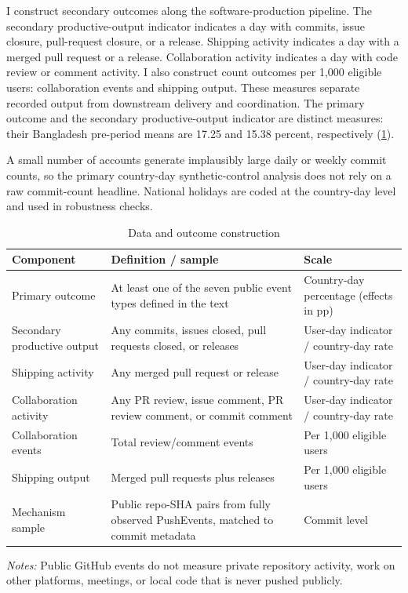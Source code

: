I construct secondary outcomes along the software-production pipeline. The secondary productive-output indicator indicates a day with commits, issue closure, pull-request closure, or a release. Shipping activity indicates a day with a merged pull request or a release. Collaboration activity indicates a day with code review or comment activity. I also construct count outcomes per 1,000 eligible users: collaboration events and shipping output. These measures separate recorded output from downstream delivery and coordination. The primary outcome and the secondary productive-output indicator are distinct measures: their Bangladesh pre-period means are 17.25 and 15.38 percent, respectively (\cref{tab:data}).

A small number of accounts generate implausibly large daily or weekly commit counts, so the primary country-day synthetic-control analysis does not rely on a raw commit-count headline. National holidays are coded at the country-day level and used in robustness checks.

\begin{table}[htbp]
\centering
\small
\caption{Data and outcome construction}
\label{tab:data}
\begin{threeparttable}
\begin{tabular}{@{}p{}p{}p{}@{}}
\toprule
Component & Definition / sample & Scale \\
\midrule
Primary outcome & At least one of the seven public event types defined in the text & Country-day percentage (effects in pp) \\
Secondary productive output & Any commits, issues closed, pull requests closed, or releases & User-day indicator / country-day rate \\
Shipping activity & Any merged pull request or release & User-day indicator / country-day rate \\
Collaboration activity & Any PR review, issue comment, PR review comment, or commit comment & User-day indicator / country-day rate \\
Collaboration events & Total review/comment events & Per 1,000 eligible users \\
Shipping output & Merged pull requests plus releases & Per 1,000 eligible users \\
Mechanism sample & Public repo-SHA pairs from fully observed PushEvents, matched to commit metadata & Commit level \\
\bottomrule
\end{tabular}
\begin{tablenotes}[flushleft]
\footnotesize
\item \textit{Notes:} Public GitHub events do not measure private repository activity, work on other platforms, meetings, or local code that is never pushed publicly.
\end{tablenotes}
\end{threeparttable}
\end{table}

